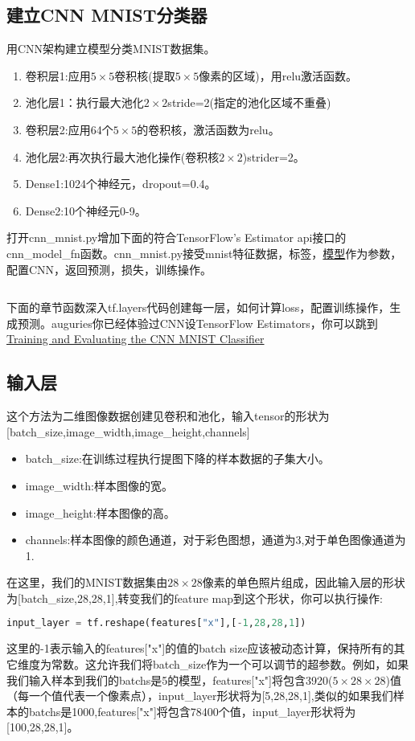 \subsection{建立CNN MNIST分类器}
用CNN架构建立模型分类MNIST数据集。
\begin{enumerate}
  \item 卷积层1:应用$5\times5$卷积核(提取$5\times5$像素的区域)，用relu激活函数。
  \item 池化层1：执行最大池化$2\times2$stride=2(指定的池化区域不重叠)
  \item 卷积层2:应用64个$5\times5$的卷积核，激活函数为relu。
  \item 池化层2:再次执行最大池化操作(卷积核$2\times2$)strider=2。
  \item Dense1:1024个神经元，dropout=0.4。
  \item Dense2:10个神经元0-9。
\end{enumerate}
打开cnn\_mnist.py增加下面的符合TensorFlow's Estimator api接口的cnn\_model\_fn函数。cnn\_mnist.py接受mnist特征数据，标签，\href{https://www.tensorflow.org/api_docs/python/tf/estimator/ModeKeys}{模型}作为参数，配置CNN，返回预测，损失，训练操作。
\begin{lstlisting}[language=Python]

\end{lstlisting}
下面的章节函数深入tf.layers代码创建每一层，如何计算loss，配置训练操作，生成预测。auguries你已经体验过CNN设TensorFlow Estimators，你可以跳到\href{https://www.tensorflow.org/tutorials/layers#training-and-evaluating-the-cnn-mnist-classifier}{Training and Evaluating the CNN MNIST Classifier}
\subsection{输入层}
 这个方法为二维图像数据创建见卷积和池化，输入tensor的形状为[batch\_size,image\_width,image\_height,channels]
\begin{itemize}
\item batch\_size:在训练过程执行提图下降的样本数据的子集大小。
\item image\_width:样本图像的宽。
\item image\_height:样本图像的高。
\item channels:样本图像的颜色通道，对于彩色图想，通道为3,对于单色图像通道为1.
\end{itemize}
在这里，我们的MNIST数据集由$28\times28$像素的单色照片组成，因此输入层的形状为[batch\_size,28,28,1],转变我们的feature map到这个形状，你可以执行操作:
\begin{lstlisting}[language=Python]
input_layer = tf.reshape(features["x"],[-1,28,28,1])
\end{lstlisting}
这里的-1表示输入的features["x"]的值的batch size应该被动态计算，保持所有的其它维度为常数。这允许我们将batch\_size作为一个可以调节的超参数。例如，如果我们输入样本到我们的batchs是5的模型，features["x"]将包含3920($5\times28\times28$)值（每一个值代表一个像素点），input\_layer形状将为[5,28,28,1],类似的如果我们样本的batchs是1000,features["x"]将包含78400个值，input\_layer形状将为[100,28,28,1]。
